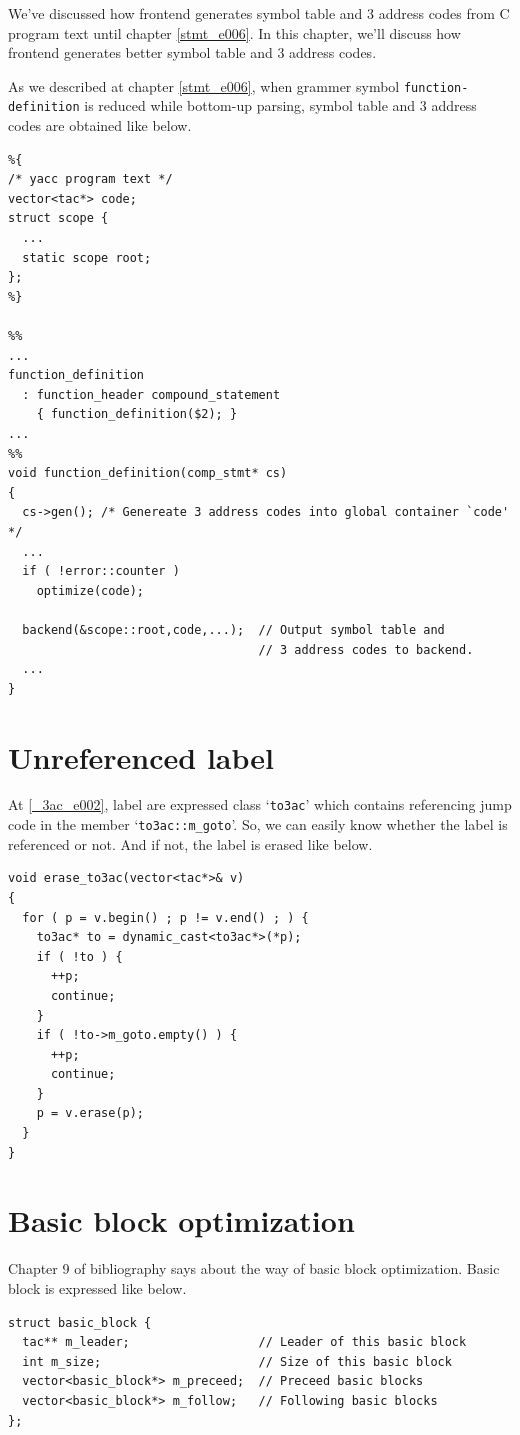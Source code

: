 \label{optimize_e051}

We've discussed how frontend generates symbol table and 3 address codes
from C program text until chapter \ref{stmt_e006}. In this chapter,
we'll discuss how frontend generates better symbol table and 3 address codes.

As we described at chapter \ref{stmt_e006},
when grammer symbol {\tt{function-definition}} is reduced
while bottom-up parsing, symbol table and 3 address codes are obtained
like below.

\begin{verbatim}
%{
/* yacc program text */
vector<tac*> code;
struct scope {
  ...
  static scope root;
};
%}

%%
...
function_definition
  : function_header compound_statement
    { function_definition($2); }
...
%%
void function_definition(comp_stmt* cs)
{
  cs->gen(); /* Genereate 3 address codes into global container `code' */
  ...
  if ( !error::counter )
    optimize(code);

  backend(&scope::root,code,...);  // Output symbol table and
                                   // 3 address codes to backend.
  ...
}
\end{verbatim}

\section{Unreferenced label}
\label{optimize_e003}
At \ref{_3ac_e002}, label are expressed class `{\tt{to3ac}}'
which contains referencing jump code in the member `{\tt{to3ac::m\_goto}}'.
So, we can easily know whether the label is referenced or not.
And if not, the label is erased like below.
\begin{verbatim}
void erase_to3ac(vector<tac*>& v)
{
  for ( p = v.begin() ; p != v.end() ; ) {
    to3ac* to = dynamic_cast<to3ac*>(*p);
    if ( !to ) {
      ++p;
      continue; 
    }
    if ( !to->m_goto.empty() ) {
      ++p;
      continue; 
    }
    p = v.erase(p);
  }
}
\end{verbatim}

\section{Basic block optimization}
\label{optimize_e058}
Chapter 9 of bibliography \cite{doragon} says about 
the way of basic block optimization. Basic block
is expressed like below.
\begin{verbatim}
struct basic_block {
  tac** m_leader;                  // Leader of this basic block
  int m_size;                      // Size of this basic block
  vector<basic_block*> m_preceed;  // Preceed basic blocks
  vector<basic_block*> m_follow;   // Following basic blocks
};
\end{verbatim}

